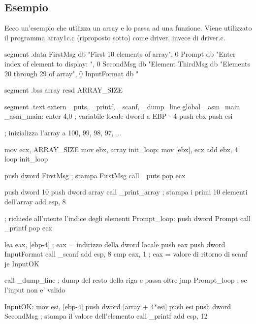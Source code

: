 \subsection{Esempio}
Ecco un'esempio che utilizza un array e lo passa ad una funzione. Viene utilizzato
il programma {\code array1c.c} (riproposto sotto) come driver, invece di
{\code driver.c}.
\begin{AsmCodeListing}[label=array1.asm]

segment .data
FirstMsg        db   "First 10 elements of array", 0
Prompt          db   "Enter index of element to display: ", 0
SecondMsg       db   "Element %
ThirdMsg        db   "Elements 20 through 29 of array", 0
InputFormat     db   "%

segment .bss
array           resd ARRAY_SIZE

segment .text
        extern  _puts, _printf, _scanf, _dump_line
        global  _asm_main
_asm_main:
        enter   4,0		; variabile locale dword a EBP - 4
        push    ebx
        push    esi

; inizializza l'array a 100, 99, 98, 97, ...

        mov     ecx, ARRAY_SIZE
        mov     ebx, array
init_loop:
        mov     [ebx], ecx
        add     ebx, 4
        loop    init_loop

        push    dword FirstMsg         ; stampa FirstMsg
        call    _puts
        pop     ecx

        push    dword 10
        push    dword array
        call    _print_array  ; stampa i primi 10 elementi dell'array
        add     esp, 8

; richiede all'utente l'indice degli elementi
Prompt_loop:
        push    dword Prompt
        call    _printf
        pop     ecx

        lea     eax, [ebp-4]      ; eax = indirizzo della dword locale
        push    eax
        push    dword InputFormat
        call    _scanf
        add     esp, 8
        cmp     eax, 1             ; eax = valore di ritorno di scanf
        je      InputOK

        call    _dump_line  ; dump del resto della riga e passa oltre
        jmp     Prompt_loop          ; se l'input non e' valido

InputOK:
        mov     esi, [ebp-4]
        push    dword [array + 4*esi]
        push    esi
        push    dword SecondMsg      ; stampa il valore dell'elemento
        call    _printf
        add     esp, 12


\end{AsmCodeListing}
